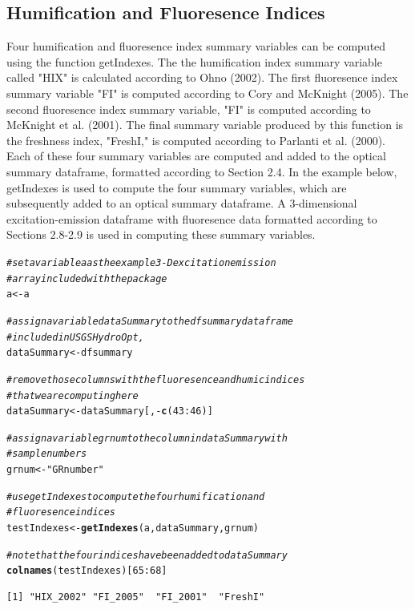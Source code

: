 \documentclass[a4paper,11pt]{article}\usepackage[]{graphicx}\usepackage[]{color}
\makeatletter
\newcommand{\hlnum}[1]{\textcolor[rgb]{0.686,0.059,0.569}{#1}}%
\newcommand{\hlstr}[1]{\textcolor[rgb]{0.192,0.494,0.8}{#1}}%
\newcommand{\hlcom}[1]{\textcolor[rgb]{0.678,0.584,0.686}{\textit{#1}}}%
\newcommand{\hlopt}[1]{\textcolor[rgb]{0,0,0}{#1}}%
\newcommand{\hlstd}[1]{\textcolor[rgb]{0.345,0.345,0.345}{#1}}%
\newcommand{\hlkwb}[1]{\textcolor[rgb]{0.69,0.353,0.396}{#1}}%
\newcommand{\hlkwd}[1]{\textcolor[rgb]{0.737,0.353,0.396}{\textbf{#1}}}%
\newenvironment{kframe}{%
 \def\at@end@of@kframe{}%
 \ifinner\ifhmode%
  \def\at@end@of@kframe{\end{minipage}}%
  \begin{minipage}{\columnwidth}%
 \fi\fi%
 \def\FrameCommand##1{\hskip\@totalleftmargin \hskip-\fboxsep
 \colorbox{shadecolor}{##1}\hskip-\fboxsep
     \hskip-\linewidth \hskip-\@totalleftmargin \hskip\columnwidth}%
 \MakeFramed {\advance\hsize-\width
   \@totalleftmargin\z@ \linewidth\hsize
   \@setminipage}}%
 {\par\unskip\endMakeFramed%
 \at@end@of@kframe}
\newenvironment{knitrout}{}{} %
\makeatother
\begin{document}
\subsection{Humification and Fluoresence Indices}
Four humification and fluoresence index summary variables can be computed using the function getIndexes. The the humification index summary variable called "HIX" is calculated according to Ohno (2002). The first fluoresence index summary variable "FI" is computed according to Cory and McKnight (2005). The second fluoresence index summary variable, "FI" is computed according to McKnight et al. (2001). The final summary variable produced by this function is the freshness index, "FreshI," is computed according to Parlanti et al. (2000). Each of these four summary variables are computed and added to the optical summary dataframe, formatted according to Section 2.4. In the example below, getIndexes is used to compute the four summary variables, which are subsequently added to an optical summary dataframe. A 3-dimensional excitation-emission dataframe with fluoresence data formatted according to Sections 2.8-2.9 is used in computing these summary variables.

\begin{knitrout}
\color{fgcolor}\begin{kframe}
\begin{alltt}
\hlcom{# set a variable a as the example 3-D excitation emission}
\hlcom{# array included with the package}
\hlstd{a} \hlkwb{<-} \hlstd{a}

\hlcom{# assign a variable dataSummary to the dfsummary dataframe}
\hlcom{# included in USGSHydroOpt,}
\hlstd{dataSummary} \hlkwb{<-} \hlstd{dfsummary}

\hlcom{# remove those columns with the fluoresence and humic indices}
\hlcom{# that we are computing here}
\hlstd{dataSummary} \hlkwb{<-} \hlstd{dataSummary[,} \hlopt{-}\hlkwd{c}\hlstd{(}\hlnum{43}\hlopt{:}\hlnum{46}\hlstd{)]}

\hlcom{# assign a variable grnum to the column in dataSummary with}
\hlcom{# sample numbers}
\hlstd{grnum} \hlkwb{<-} \hlstr{"GRnumber"}

\hlcom{# use getIndexes to compute the four humification and}
\hlcom{# fluoresence indices}
\hlstd{testIndexes} \hlkwb{<-} \hlkwd{getIndexes}\hlstd{(a, dataSummary, grnum)}

\hlcom{# note that the four indices have been added to dataSummary}
\hlkwd{colnames}\hlstd{(testIndexes)[}\hlnum{65}\hlopt{:}\hlnum{68}\hlstd{]}
\end{alltt}
\begin{verbatim}
[1] "HIX_2002" "FI_2005"  "FI_2001"  "FreshI"  
\end{verbatim}
\end{kframe}
\end{knitrout}
\end{document}
